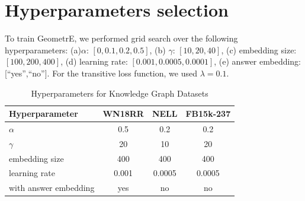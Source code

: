 \documentclass[runningheads]{llncs}
\newcommand{\method}{GeometrE}
\begin{document}
\section{Hyperparameters selection}
\label{app:hyperparameters}

To train \method{}, we performed grid search over the following
hyperparameters: (a)$\alpha$: $[0, 0.1, 0.2, 0.5]$, (b) $\gamma$:
$[10, 20, 40]$, (c) embedding size: $[100, 200, 400]$, (d)
learning rate: $[0.001, 0.0005, 0.0001]$, (e) answer embedding:
[``yes'',``no'']. For the transitive loss function, we used
$\lambda=0.1$.

\begin{table}[h]
\centering
\caption{Hyperparameters for Knowledge Graph Datasets}
\begin{tabular}{lccc}
\toprule
\textbf{Hyperparameter} & \textbf{WN18RR} & \textbf{NELL} & \textbf{FB15k-237} \\
\midrule
$\alpha$ & 0.5 & 0.2 & 0.2 \\
$\gamma$ & 20 & 10 & 20 \\
embedding size & 400 & 400 & 400 \\
learning rate & 0.001 & 0.0005 & 0.0005 \\
with answer embedding & yes & no & no \\
\bottomrule
\end{tabular}
\end{table}
\end{document}
